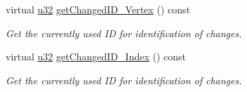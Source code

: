 \begin{DoxyCompactItemize}
virtual \hyperlink{namespaceirr_a0416a53257075833e7002efd0a18e804}{u32} \hyperlink{structirr_1_1scene_1_1SSharedMeshBuffer_ad9c7307fcad8c9b8db3db98f95863196}{get\+Changed\+I\+D\+\_\+\+Vertex} () const
\begin{DoxyCompactList}\small\item\em Get the currently used ID for identification of changes. \end{DoxyCompactList}\item 
virtual \hyperlink{namespaceirr_a0416a53257075833e7002efd0a18e804}{u32} \hyperlink{structirr_1_1scene_1_1SSharedMeshBuffer_a0a37d52f7ec9917d9ca0d9dd908917b9}{get\+Changed\+I\+D\+\_\+\+Index} () const
\begin{DoxyCompactList}\small\item\em Get the currently used ID for identification of changes. \end{DoxyCompactList}\end{DoxyCompactItemize}
